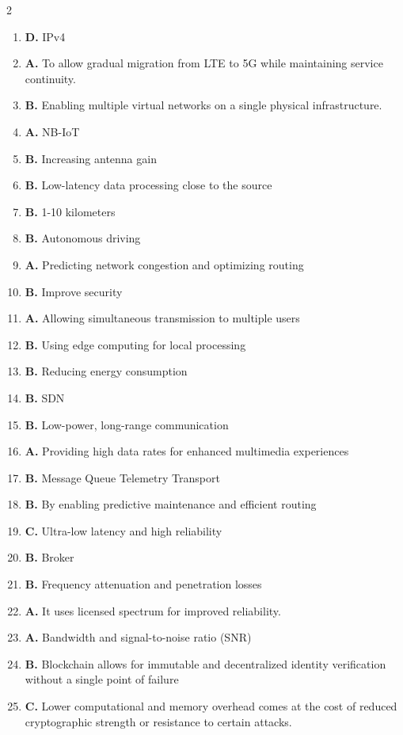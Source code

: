 \documentclass[12pt]{article}
\begin{document}
\begin{multicols}{2}
\begin{enumerate}
    \item \textbf{D.} IPv4
    \item \textbf{A.} To allow gradual migration from LTE to 5G while maintaining service continuity.
    \item \textbf{B.} Enabling multiple virtual networks on a single physical infrastructure.
    \item \textbf{A.} NB-IoT
    \item \textbf{B.} Increasing antenna gain
    \item \textbf{B.} Low-latency data processing close to the source
    \item \textbf{B.} 1-10 kilometers
    \item \textbf{B.} Autonomous driving
    \item \textbf{A.} Predicting network congestion and optimizing routing  
    \item \textbf{B.} Improve security
    \item \textbf{A.} Allowing simultaneous transmission to multiple users
    \item \textbf{B.} Using edge computing for local processing
    \item \textbf{B.} Reducing energy consumption
    \item \textbf{B.} SDN
    \item \textbf{B.} Low-power, long-range communication
    \item \textbf{A.} Providing high data rates for enhanced multimedia experiences
    \item \textbf{B.} Message Queue Telemetry Transport
    \item \textbf{B.} By enabling predictive maintenance and efficient routing
    \item \textbf{C.} Ultra-low latency and high reliability
    \item \textbf{B.} Broker
    \item \textbf{B.} Frequency attenuation and penetration losses
    \item \textbf{A.} It uses licensed spectrum for improved reliability.
    \item \textbf{A.} Bandwidth and signal-to-noise ratio (SNR)
    \item \textbf{B.} Blockchain allows for immutable and decentralized identity verification without a single point of failure
    \item \textbf{C.} Lower computational and memory overhead comes at the cost of reduced cryptographic strength or resistance to certain attacks.
\end{enumerate}
\end{multicols}
\end{document}
